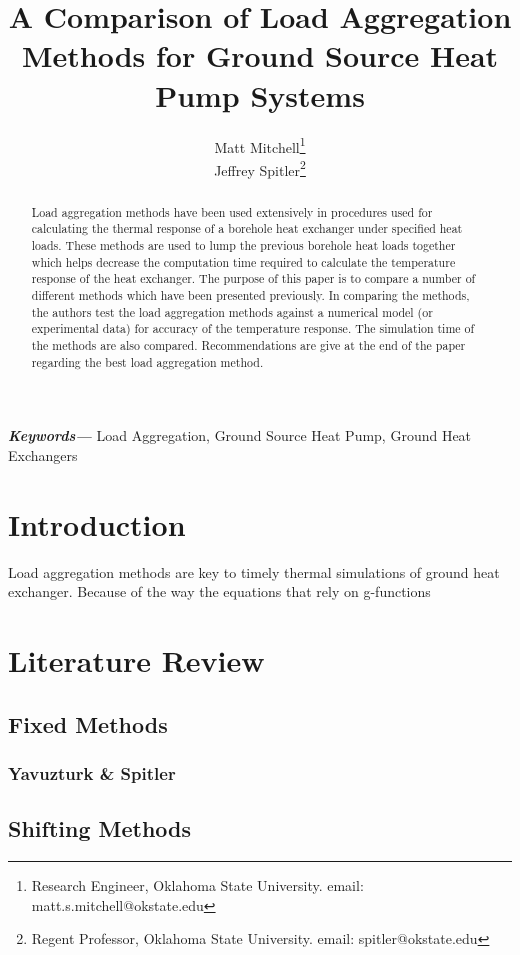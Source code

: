 \documentclass{article}
\title{A Comparison of Load Aggregation Methods for Ground Source Heat Pump Systems}
\author{Matt Mitchell\footnote{Research Engineer, Oklahoma State University. email: matt.s.mitchell@okstate.edu} \\ Jeffrey Spitler\footnote{Regent Professor, Oklahoma State University. email: spitler@okstate.edu}}
\providecommand{\keywords}[1]{\textbf{\textit{Keywords---}} #1}
\begin{document}
\maketitle
{}

\begin{abstract}
Load aggregation methods have been used extensively in procedures used for calculating the thermal response of a borehole heat exchanger under specified heat loads. These methods are used to lump the previous borehole heat loads together which helps decrease the computation time required to calculate the temperature response of the heat exchanger. The purpose of this paper is to compare a number of different methods which have been presented previously. In comparing the methods, the authors test the load aggregation methods against a numerical model (or experimental data) for accuracy of the temperature response. The simulation time of the methods are also compared. Recommendations are give at the end of the paper regarding the best load aggregation method.
\end{abstract}

\keywords{Load Aggregation, Ground Source Heat Pump, Ground Heat Exchangers}

\section{Introduction}

Load aggregation methods are key to timely thermal simulations of ground heat exchanger. Because of the way the equations that rely on g-functions \cite{Adams_Schweickart_1987}


\section{Literature Review}

\subsection{Fixed Methods}

\subsubsection{Yavuzturk \& Spitler}

\subsection{Shifting Methods}
\end{document}
